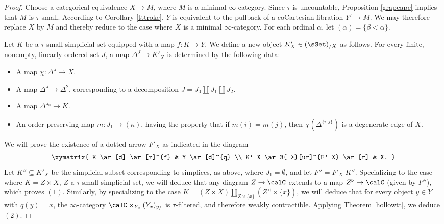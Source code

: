 \begin{proof}
Choose a categorical equivalence $X \rightarrow M$, where $M$ is a minimal $\infty$-category. Since $\tau$ is uncountable, Proposition \ref{grapeape} implies that $M$ is $\tau$-small.
According to Corollary \ref{tttroke}, $Y$ is equivalent to the pullback of a coCartesian fibration $Y' \rightarrow M$. We may therefore replace $X$ by $M$ and thereby reduce to the case where
$X$ is a minimal $\infty$-category. For each ordinal $\alpha$, let $(\alpha)= \{ \beta < \alpha\}$. 

Let $K$ be a $\tau$-small simplicial set equipped with a map $f: K \rightarrow Y$.
We define a new object $K'_{X} \in (\sSet)_{/X}$ as follows. For every finite, nonempty, linearly ordered set $J$, a map $\Delta^J \rightarrow K'_X$ is determined by the following data:

\begin{itemize}
\item A map $\chi: \Delta^{J} \rightarrow X$.

\item A map $\Delta^J \rightarrow \Delta^2$, corresponding to a decomposition
$J = J_0 \coprod J_1 \coprod J_2$.

\item A map $\Delta^{J_0} \rightarrow K$.

\item An order-preserving map $m: J_1 \rightarrow (\kappa)$, having the property that
if $m(i) = m(j)$, then $\chi( \Delta^{ \{i,j\} })$ is a degenerate edge of $X$.
\end{itemize} 

We will prove the existence of a dotted arrow $F'_X$ as indicated in the diagram
$$ \xymatrix{ K \ar[d] \ar[r]^{f} & Y \ar[d]^{q} \\
K'_X \ar@{-->}[ur]^{F'_X} \ar[r] & X. }$$
Let $K'' \subseteq K'_X$ be the simplicial subset corresponding to simplices, as above, where
$J_1 = \emptyset$, and let $F'' = F'_X | K''$. Specializing to the case where $K = Z \times X$, $Z$ a $\tau$-small simplicial set, we will deduce that any diagram $Z \rightarrow \calC$ extends to a map $Z^{\triangleright} \rightarrow \calC$ (given by $F''$), which proves $(1)$. Similarly, by specializing to the case $K = (Z \times X) \coprod_{ Z \times \{x\} } (Z^{\triangleleft} \times \{x\} )$, we will deduce that for every object $y \in Y$ with $q(y) = x$, the $\infty$-category
$\calC \times_{ Y_{x} } (Y_{x})_{y/}$ is $\tau$-filtered, and therefore weakly contractible. 
Applying Theorem \ref{hollowtt}, we deduce $(2)$. 


\end{proof}
